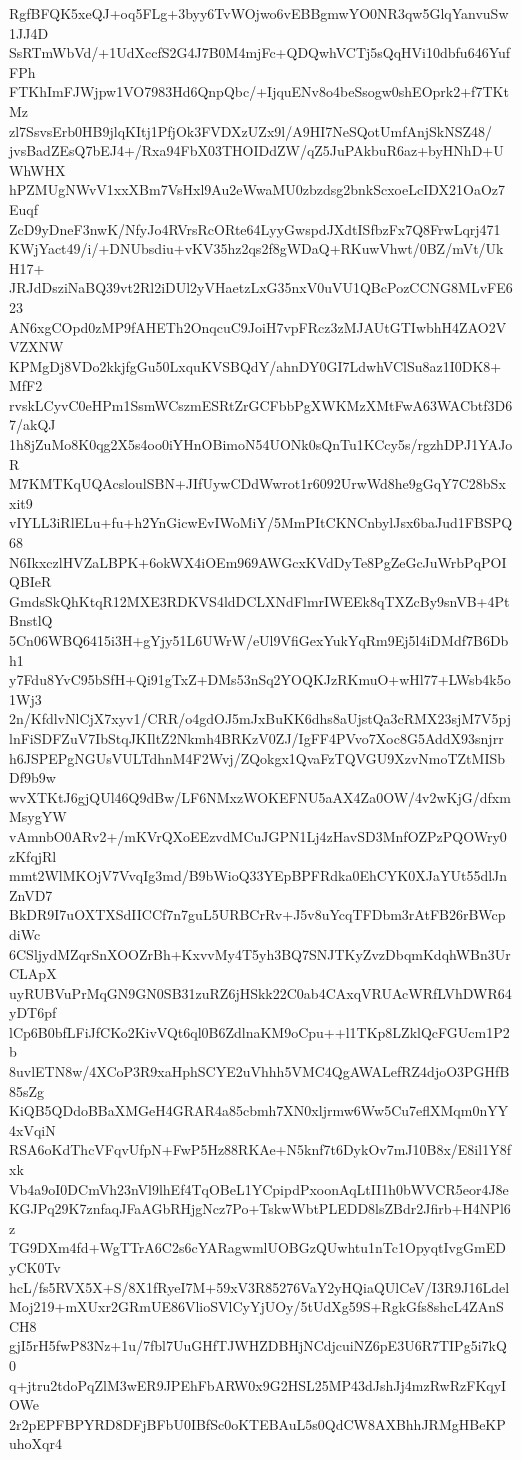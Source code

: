 RgfBFQK5xeQJ+oq5FLg+3byy6TvWOjwo6vEBBgmwYO0NR3qw5GlqYanvuSw1JJ4D
SsRTmWbVd/+1UdXccfS2G4J7B0M4mjFc+QDQwhVCTj5sQqHVi10dbfu646YufFPh
FTKhImFJWjpw1VO7983Hd6QnpQbc/+IjquENv8o4beSsogw0shEOprk2+f7TKtMz
zl7SsvsErb0HB9jlqKItj1PfjOk3FVDXzUZx9l/A9HI7NeSQotUmfAnjSkNSZ48/
jvsBadZEsQ7bEJ4+/Rxa94FbX03THOIDdZW/qZ5JuPAkbuR6az+byHNhD+UWhWHX
hPZMUgNWvV1xxXBm7VsHxl9Au2eWwaMU0zbzdsg2bnkScxoeLcIDX21OaOz7Euqf
ZcD9yDneF3nwK/NfyJo4RVrsRcORte64LyyGwspdJXdtISfbzFx7Q8FrwLqrj471
KWjYact49/i/+DNUbsdiu+vKV35hz2qs2f8gWDaQ+RKuwVhwt/0BZ/mVt/UkH17+
JRJdDsziNaBQ39vt2Rl2iDUl2yVHaetzLxG35nxV0uVU1QBcPozCCNG8MLvFE623
AN6xgCOpd0zMP9fAHETh2OnqcuC9JoiH7vpFRcz3zMJAUtGTIwbhH4ZAO2VVZXNW
KPMgDj8VDo2kkjfgGu50LxquKVSBQdY/ahnDY0GI7LdwhVClSu8az1I0DK8+MfF2
rvskLCyvC0eHPm1SsmWCszmESRtZrGCFbbPgXWKMzXMtFwA63WACbtf3D67/akQJ
1h8jZuMo8K0qg2X5s4oo0iYHnOBimoN54UONk0sQnTu1KCcy5s/rgzhDPJ1YAJoR
M7KMTKqUQAcsloulSBN+JIfUywCDdWwrot1r6092UrwWd8he9gGqY7C28bSxxit9
vIYLL3iRlELu+fu+h2YnGicwEvIWoMiY/5MmPItCKNCnbylJsx6baJud1FBSPQ68
N6IkxczlHVZaLBPK+6okWX4iOEm969AWGcxKVdDyTe8PgZeGcJuWrbPqPOIQBIeR
GmdsSkQhKtqR12MXE3RDKVS4ldDCLXNdFlmrIWEEk8qTXZcBy9snVB+4PtBnstlQ
5Cn06WBQ6415i3H+gYjy51L6UWrW/eUl9VfiGexYukYqRm9Ej5l4iDMdf7B6Dbh1
y7Fdu8YvC95bSfH+Qi91gTxZ+DMs53nSq2YOQKJzRKmuO+wHl77+LWsb4k5o1Wj3
2n/KfdlvNlCjX7xyv1/CRR/o4gdOJ5mJxBuKK6dhs8aUjstQa3cRMX23sjM7V5pj
lnFiSDFZuV7IbStqJKIltZ2Nkmh4BRKzV0ZJ/IgFF4PVvo7Xoc8G5AddX93snjrr
h6JSPEPgNGUsVULTdhnM4F2Wvj/ZQokgx1QvaFzTQVGU9XzvNmoTZtMISbDf9b9w
wvXTKtJ6gjQUl46Q9dBw/LF6NMxzWOKEFNU5aAX4Za0OW/4v2wKjG/dfxmMsygYW
vAmnbO0ARv2+/mKVrQXoEEzvdMCuJGPN1Lj4zHavSD3MnfOZPzPQOWry0zKfqjRl
mmt2WlMKOjV7VvqIg3md/B9bWioQ33YEpBPFRdka0EhCYK0XJaYUt55dlJnZnVD7
BkDR9I7uOXTXSdIICCf7n7guL5URBCrRv+J5v8uYcqTFDbm3rAtFB26rBWcpdiWc
6CSljydMZqrSnXOOZrBh+KxvvMy4T5yh3BQ7SNJTKyZvzDbqmKdqhWBn3UrCLApX
uyRUBVuPrMqGN9GN0SB31zuRZ6jHSkk22C0ab4CAxqVRUAcWRfLVhDWR64yDT6pf
lCp6B0bfLFiJfCKo2KivVQt6ql0B6ZdlnaKM9oCpu++l1TKp8LZklQcFGUcm1P2b
8uvlETN8w/4XCoP3R9xaHphSCYE2uVhhh5VMC4QgAWALefRZ4djoO3PGHfB85sZg
KiQB5QDdoBBaXMGeH4GRAR4a85cbmh7XN0xljrmw6Ww5Cu7eflXMqm0nYY4xVqiN
RSA6oKdThcVFqvUfpN+FwP5Hz88RKAe+N5knf7t6DykOv7mJ10B8x/E8il1Y8fxk
Vb4a9oI0DCmVh23nVl9lhEf4TqOBeL1YCpipdPxoonAqLtII1h0bWVCR5eor4J8e
KGJPq29K7znfaqJFaAGbRHjgNcz7Po+TskwWbtPLEDD8lsZBdr2Jfirb+H4NPl6z
TG9DXm4fd+WgTTrA6C2s6cYARagwmlUOBGzQUwhtu1nTc1OpyqtIvgGmEDyCK0Tv
hcL/fs5RVX5X+S/8X1fRyeI7M+59xV3R85276VaY2yHQiaQUlCeV/I3R9J16Ldel
Moj219+mXUxr2GRmUE86VlioSVlCyYjUOy/5tUdXg59S+RgkGfs8shcL4ZAnSCH8
gjI5rH5fwP83Nz+1u/7fbl7UuGHfTJWHZDBHjNCdjcuiNZ6pE3U6R7TIPg5i7kQ0
q+jtru2tdoPqZlM3wER9JPEhFbARW0x9G2HSL25MP43dJshJj4mzRwRzFKqyIOWe
2r2pEPFBPYRD8DFjBFbU0IBfSc0oKTEBAuL5s0QdCW8AXBhhJRMgHBeKPuhoXqr4
